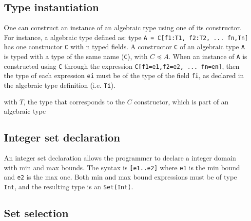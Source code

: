 \documentclass[11pt]{report}
\begin{document}
\subsection{Type instantiation}

One can construct an instance of an algebraic type using one of its constructor. For instance, a algebraic type defined as: type \texttt{A = C[f1:T1, f2:T2, ... fn,Tn]} has one constructor \texttt{C} with n typed fields. A constructor \texttt{C} of an algebraic type \texttt{A} is typed with a type of the same name (\texttt{C}), with $C \preceq A$. When an instance of \texttt{A} is constructed using \texttt{C} through the expression \texttt{C[f1=e1,f2=e2, ... fn=en]}, then the type of each expression \texttt{ei} must be of the type of the field \texttt{fi}, as declared in the algebraic type definition (i.e. \texttt{Ti}).

\begin{center}
 
\DP
\end{center}
\begin{center}with  $T$, the type that corresponds to the $C$ constructor, which is part of an algebraic type\end{center}

\subsection{Integer set declaration}

An integer set declaration allows the programmer to declare a integer domain with min and max bounds. The syntax is \texttt{[e1..e2]} where \texttt{e1} is the min bound and \texttt{e2} is the max one. Both min and max bound expressions must be of type \texttt{Int}, and the resulting type is an \texttt{Set(Int)}.

\begin{center}
 
\DP
\end{center}

\subsection{Set selection}
\end{document}
